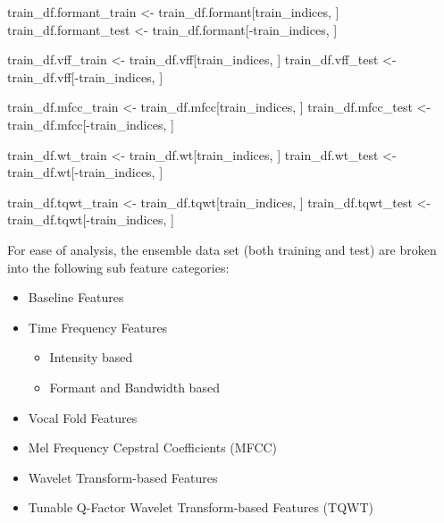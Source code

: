 \documentclass[
]{article}
\newenvironment{Shaded}{\begin{snugshade}}{\end{snugshade}}
\newcommand{\NormalTok}[1]{#1}
\newcommand{\OtherTok}[1]{\textcolor[rgb]{0.56,0.35,0.01}{#1}}
\newcommand{\SpecialCharTok}[1]{\textcolor[rgb]{0.00,0.00,0.00}{#1}}
\providecommand{\tightlist}{%
  \setlength{\itemsep}{0pt}\setlength{\parskip}{0pt}}
\begin{document}
\begin{Shaded}
\begin{Highlighting}[]
\NormalTok{train\_df.formant\_train }\OtherTok{\textless{}{-}}\NormalTok{ train\_df.formant[train\_indices, ]}
\NormalTok{train\_df.formant\_test }\OtherTok{\textless{}{-}}\NormalTok{ train\_df.formant[}\SpecialCharTok{{-}}\NormalTok{train\_indices, ]}

\NormalTok{train\_df.vff\_train }\OtherTok{\textless{}{-}}\NormalTok{ train\_df.vff[train\_indices, ]}
\NormalTok{train\_df.vff\_test }\OtherTok{\textless{}{-}}\NormalTok{ train\_df.vff[}\SpecialCharTok{{-}}\NormalTok{train\_indices, ]}

\NormalTok{train\_df.mfcc\_train }\OtherTok{\textless{}{-}}\NormalTok{ train\_df.mfcc[train\_indices, ]}
\NormalTok{train\_df.mfcc\_test }\OtherTok{\textless{}{-}}\NormalTok{ train\_df.mfcc[}\SpecialCharTok{{-}}\NormalTok{train\_indices, ]}

\NormalTok{train\_df.wt\_train }\OtherTok{\textless{}{-}}\NormalTok{ train\_df.wt[train\_indices, ]}
\NormalTok{train\_df.wt\_test }\OtherTok{\textless{}{-}}\NormalTok{ train\_df.wt[}\SpecialCharTok{{-}}\NormalTok{train\_indices, ]}

\NormalTok{train\_df.tqwt\_train }\OtherTok{\textless{}{-}}\NormalTok{ train\_df.tqwt[train\_indices, ]}
\NormalTok{train\_df.tqwt\_test }\OtherTok{\textless{}{-}}\NormalTok{ train\_df.tqwt[}\SpecialCharTok{{-}}\NormalTok{train\_indices, ]}
\end{Highlighting}
\end{Shaded}

\newpage

For ease of analysis, the ensemble data set (both training and test) are broken into the following sub feature categories:

\begin{itemize}
\tightlist
\item
  Baseline Features
\item
  Time Frequency Features

  \begin{itemize}
  \tightlist
  \item
    Intensity based
  \item
    Formant and Bandwidth based
  \end{itemize}
\item
  Vocal Fold Features
\item
  Mel Frequency Cepstral Coefficients (MFCC)
\item
  Wavelet Transform-based Features
\item
  Tunable Q-Factor Wavelet Transform-based Features (TQWT)
\end{itemize}
\end{document}
